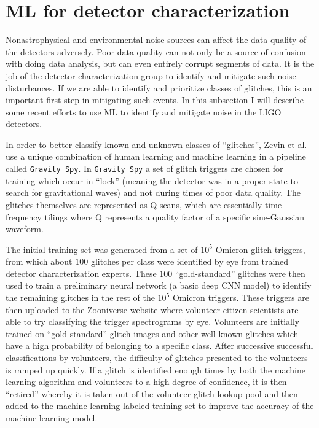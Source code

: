 \section{ML for detector characterization}

%

Nonastrophysical and environmental noise sources can affect the data quality of the detectors adversely. Poor data quality can not only be a source of confusion with doing data analysis, but can even entirely corrupt segments of data. It is the job of the detector characterization group to identify and mitigate such noise disturbances. If we are able to identify and prioritize classes of glitches, this is an important first step in mitigating such events. In this subsection I will describe some recent efforts to use \ac{ML} to identify and mitigate noise in the \ac{LIGO} detectors.

%
%

In order to better classify known and unknown classes of ``glitches'', Zevin et al. \cite{0264-9381-34-6-064003} use a unique combination of human learning and machine learning in a pipeline called \texttt{Gravity Spy}. In \texttt{Gravity Spy} a set of glitch triggers are chosen for training which occur in ``lock'' (meaning the detector was in a proper state to search for gravitational waves) and not during times of poor data quality. The glitches themselves are represented as Q-scans, which are essentially time-frequency tilings where Q represents a quality factor of a specific sine-Gaussian waveform. 

%
%
The initial training set was generated from a set of $10^5$ Omicron glitch triggers, from which about $100$ glitches per class were identified by eye from trained detector characterization experts. These $100$ ``gold-standard'' glitches were then used to train a preliminary neural network (a basic deep \ac{CNN} model) to identify the remaining glitches in the rest of the $10^5$ Omicron triggers. These triggers are then uploaded to the Zooniverse website where volunteer citizen scientists are able to try classifying the trigger spectrograms by eye. Volunteers are initially trained on ``gold standard'' glitch images and other well known glitches which have a high probability of belonging to a specific class. After successive successful classifications by volunteers, the difficulty of glitches presented to the volunteers is ramped up quickly. If a glitch is identified enough times by both the machine learning algorithm and volunteers to a high degree of confidence, it is then ``retired'' whereby it is taken out of the volunteer glitch lookup pool and then added to the machine learning labeled training set to improve the accuracy of the machine learning model.

